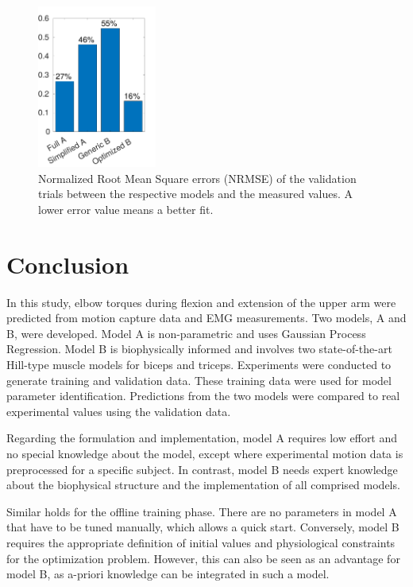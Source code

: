 \begin{figure}%
  \centering%
  \includegraphics[width=0.35\textwidth]{images/summer_school_study/nrmse.pdf}%
  \caption{Normalized Root Mean Square errors (NRMSE) of the validation trials between the respective models and the measured values. A lower error value means a better fit.}%
  \label{fig:nrmse}%
\end{figure}%

\section{Conclusion}\label{sec:study_conclusion}
In this study, elbow torques during flexion and extension of the upper arm were predicted from motion capture data and EMG measurements. Two models, A and B, were developed. Model A is non-parametric and uses Gaussian Process Regression. Model B is biophysically informed and involves two state-of-the-art Hill-type muscle models for biceps and triceps. Experiments were conducted to generate training and validation data. These training data were used for model parameter identification. Predictions from the two models were compared to real experimental values using the validation data.

Regarding the formulation and implementation, model A requires low effort and no special knowledge about the model, except where experimental motion data is preprocessed for a specific subject. In contrast, model B needs expert knowledge about the biophysical structure and the implementation of all comprised models.

Similar holds for the offline training phase. There are no parameters in model A that have to be tuned manually, which allows a quick start. Conversely, model B requires the appropriate definition of initial values and physiological constraints for the optimization problem. However, this can also be seen as an advantage for model B, as a-priori knowledge can be integrated in such a model.

